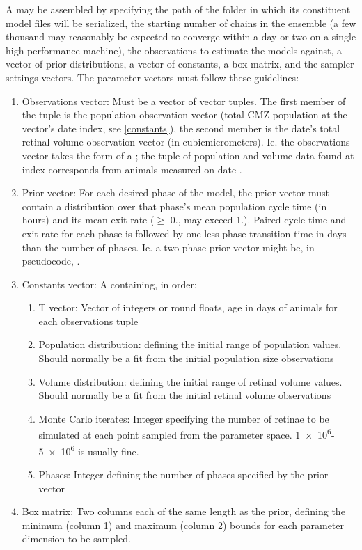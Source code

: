 \documentclass{ut-thesis}
\begin{document}
\begin{NoHyper}
A  may be assembled by specifying the path of the folder in which its constituent model files will be serialized, the starting number of chains in the ensemble (a few thousand may reasonably be expected to converge within a day or two on a single high performance machine), the observations to estimate the models against, a vector of prior distributions, a vector of constants, a box matrix, and the sampler settings vectors. The parameter vectors must follow these guidelines:

\begin{enumerate}
    \item Observations vector: Must be a vector of vector tuples. The first member of the tuple is the population observation vector (total CMZ population at the vector's date index, see \ref{constants}), the second member is the date's total retinal volume observation vector (in \si{cubic}{micro}{meters}). Ie. the observations vector takes the form of a ; the tuple of population and volume data found at index  corresponds from animals measured on date .
    \item Prior vector: For each desired phase of the model, the prior vector must contain a distribution over that phase's mean population cycle time (in hours) and its mean exit rate ($\geq$ 0., may exceed 1.). Paired cycle time and exit rate for each phase is followed by one less phase transition time in days than the number of phases. Ie. a two-phase prior vector might be, in pseudocode, . 
    \item\label{constants} Constants vector: A  containing, in order:
    \begin{enumerate}
        \item T vector: Vector of integers or round floats, age in days of animals for each observations tuple
        \item Population distribution:  defining the initial range of population values. Should normally be a fit from the initial population size observations
        \item Volume distribution:   defining the initial range of retinal volume values. Should normally be a fit from the initial retinal volume observations
        \item Monte Carlo iterates: Integer specifying the number of retinae to be simulated at each point sampled from the parameter space. \num{1e6}-\num{5e6} is usually fine.
        \item Phases: Integer defining the number of phases specified by the prior vector
    \end{enumerate}
    \item Box matrix: Two columns each of the same length as the prior, defining the minimum (column 1) and maximum (column 2) bounds for each parameter dimension to be sampled.
\end{enumerate}


\end{NoHyper}
\end{document}

